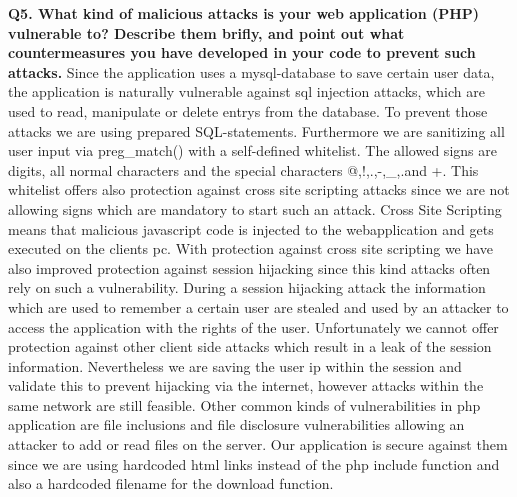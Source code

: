 {\bf Q5. What kind of malicious attacks is your web application (PHP) vulnerable to? Describe them brifly, and point out what countermeasures you have
developed in your code to prevent such attacks.}
\newline
\noindent
Since the application uses a mysql-database to save certain user data, the application is naturally vulnerable against sql injection attacks, which are used to read, manipulate or delete entrys from the database. To prevent those attacks we are using prepared SQL-statements. Furthermore we are sanitizing all user input via preg_match() with a self-defined whitelist. The allowed signs are digits, all normal characters and the special characters @,!,.,-,_,.and +. This whitelist offers also protection against cross site scripting attacks since we are not allowing signs which are mandatory to start such an attack. Cross Site Scripting means that malicious javascript code is injected to the webapplication and gets executed on the clients pc. \newline
With protection against cross site scripting we have also improved protection against session hijacking since this kind attacks often rely on such a vulnerability. During a session hijacking attack the information which are used to remember a certain user are stealed and used by an attacker to access the application with the rights of the user. Unfortunately we cannot offer protection against other client side attacks which result in a leak of the session information. Nevertheless we are saving the user ip within the session and validate this to prevent hijacking via the internet, however attacks within the same network are still feasible.
\newline
Other common kinds of vulnerabilities in php application are file inclusions and file disclosure vulnerabilities allowing an attacker to add or read files on the server. Our application is secure against them since we are using hardcoded html links instead of the php include function and also a hardcoded filename for the download function.










